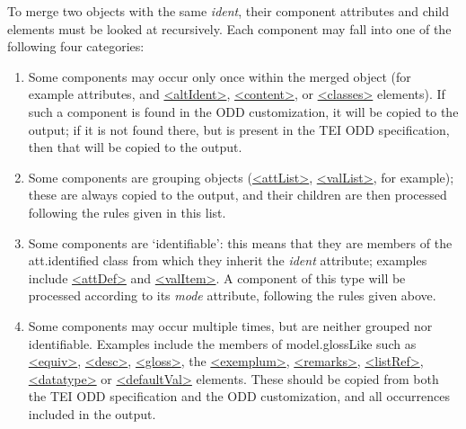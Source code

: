 To merge two objects with the same {\itshape ident}, their component attributes and child elements must be looked at recursively. Each component may fall into one of the following four categories: \begin{enumerate}
\item Some components may occur only once within the merged object (for example attributes, and \hyperref[TEI.altIdent]{<altIdent>}, \hyperref[TEI.content]{<content>}, or \hyperref[TEI.classes]{<classes>} elements). If such a component is found in the ODD customization, it will be copied to the output; if it is not found there, but is present in the TEI ODD specification, then that will be copied to the output.
\item Some components are grouping objects (\hyperref[TEI.attList]{<attList>}, \hyperref[TEI.valList]{<valList>}, for example); these are always copied to the output, and their children are then processed following the rules given in this list.
\item Some components are ‘identifiable’: this means that they are members of the \textsf{att.identified} class from which they inherit the {\itshape ident} attribute; examples include \hyperref[TEI.attDef]{<attDef>} and \hyperref[TEI.valItem]{<valItem>}. A component of this type will be processed according to its {\itshape mode} attribute, following the rules given above.
\item Some components may occur multiple times, but are neither grouped nor identifiable. Examples include the members of \textsf{model.glossLike} such as \hyperref[TEI.equiv]{<equiv>}, \hyperref[TEI.desc]{<desc>}, \hyperref[TEI.gloss]{<gloss>}, the \hyperref[TEI.exemplum]{<exemplum>}, \hyperref[TEI.remarks]{<remarks>}, \hyperref[TEI.listRef]{<listRef>}, \hyperref[TEI.datatype]{<datatype>} or \hyperref[TEI.defaultVal]{<defaultVal>} elements. These should be copied from both the TEI ODD specification and the ODD customization, and all occurrences included in the output.
\end{enumerate}\par
